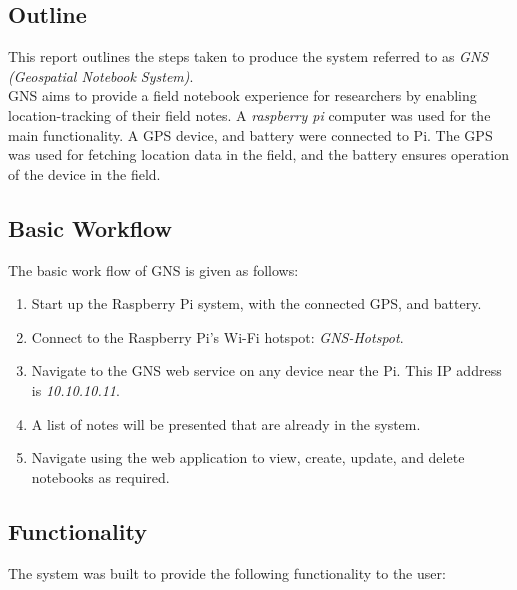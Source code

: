 
\subsection*{Outline}
This report outlines the steps taken to produce the system referred to as \textit{GNS (Geospatial Notebook System)}.\\
GNS aims to provide a field notebook experience for researchers by enabling location-tracking of their field notes. A \textit{raspberry pi} computer was used for the main functionality. A GPS device, and battery were connected to Pi. The GPS was used for fetching location data in the field, and the battery ensures operation of the device in the field. 

\subsection*{Basic Workflow}
The basic work flow of GNS is given as follows:\\

\begin{enumerate}
	\item Start up the Raspberry Pi system, with the connected GPS, and battery.
	\item Connect to the Raspberry Pi's Wi-Fi hotspot: \textit{GNS-Hotspot}.
	\item Navigate to the GNS web service on any device near the Pi. This IP address is \textit{10.10.10.11}.
	\item A list of notes will be presented that are already in the system.
	\item Navigate using the web application to view, create, update, and delete notebooks as required.
\end{enumerate}

\subsection*{Functionality}
The system was built to provide the following functionality to the user:\\


